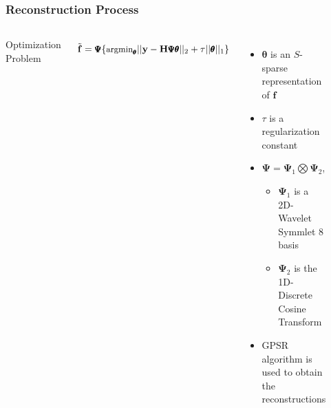 \documentclass{beamer}
\begin{document}

\begin{frame}
\frametitle{Reconstruction Process}


\begin{columns}
\column{2in}

Optimization Problem

\begin{equation*}
\small
\tilde{\mathbf{f}} = \pmb{\Psi}\lbrace\text{argmin}_{\pmb{\theta}}\vert\vert \mathbf{y}-\mathbf{H}\pmb{\Psi}\pmb{\theta}\vert\vert_2+\tau \vert\vert \pmb{\theta}\vert\vert_1\rbrace
\end{equation*}

\begin{itemize}%
\item $\pmb{\theta}$ is an $S$-sparse representation of $\mathbf{f}$
\item $\tau$ is a regularization constant
\item $\pmb{\Psi}=\pmb{\Psi}_1 \bigotimes \pmb{\Psi}_2$, 
\begin{itemize}
\item $\pmb{\Psi}_1$ is a 2D-Wavelet Symmlet 8 basis 
\item $\pmb{\Psi}_2$ is the 1D-Discrete Cosine Transform
\end{itemize}

\item GPSR algorithm is used to obtain the reconstructions
\end{itemize}

\column{2.5in}
\begin{figure}
\includegraphics[scale=0.35]{FiguresUpd/CASSIandRGBrec.png}
\end{figure}


\end{columns}
\end{frame}
\end{document}
